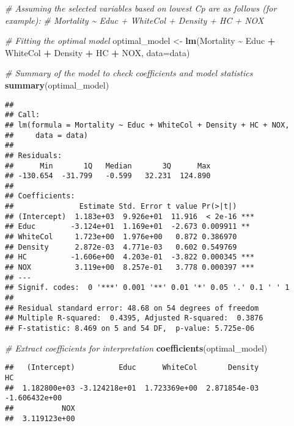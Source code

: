 \documentclass[
]{article}
\newenvironment{Shaded}{\begin{snugshade}}{\end{snugshade}}
\newcommand{\AttributeTok}[1]{\textcolor[rgb]{0.13,0.29,0.53}{#1}}
\newcommand{\CommentTok}[1]{\textcolor[rgb]{0.56,0.35,0.01}{\textit{#1}}}
\newcommand{\FunctionTok}[1]{\textcolor[rgb]{0.13,0.29,0.53}{\textbf{#1}}}
\newcommand{\NormalTok}[1]{#1}
\newcommand{\OtherTok}[1]{\textcolor[rgb]{0.56,0.35,0.01}{#1}}
\newcommand{\SpecialCharTok}[1]{\textcolor[rgb]{0.81,0.36,0.00}{\textbf{#1}}}
\begin{document}
\begin{Shaded}
\begin{Highlighting}[]
\CommentTok{\# Assuming the selected variables based on lowest Cp are as follows (for example):}
\CommentTok{\# Mortality \textasciitilde{} Educ + WhiteCol + Density + HC + NOX}

\CommentTok{\# Fitting the optimal model}
\NormalTok{optimal\_model }\OtherTok{\textless{}{-}} \FunctionTok{lm}\NormalTok{(Mortality }\SpecialCharTok{\textasciitilde{}}\NormalTok{ Educ }\SpecialCharTok{+}\NormalTok{ WhiteCol }\SpecialCharTok{+}\NormalTok{ Density }\SpecialCharTok{+}\NormalTok{ HC }\SpecialCharTok{+}\NormalTok{ NOX, }\AttributeTok{data=}\NormalTok{data)}

\CommentTok{\# Summary of the model to check coefficients and model statistics}
\FunctionTok{summary}\NormalTok{(optimal\_model)}
\end{Highlighting}
\end{Shaded}

\begin{verbatim}
## 
## Call:
## lm(formula = Mortality ~ Educ + WhiteCol + Density + HC + NOX, 
##     data = data)
## 
## Residuals:
##      Min       1Q   Median       3Q      Max 
## -130.654  -31.799   -0.599   32.231  124.890 
## 
## Coefficients:
##               Estimate Std. Error t value Pr(>|t|)    
## (Intercept)  1.183e+03  9.926e+01  11.916  < 2e-16 ***
## Educ        -3.124e+01  1.169e+01  -2.673 0.009911 ** 
## WhiteCol     1.723e+00  1.976e+00   0.872 0.386970    
## Density      2.872e-03  4.771e-03   0.602 0.549769    
## HC          -1.606e+00  4.203e-01  -3.822 0.000345 ***
## NOX          3.119e+00  8.257e-01   3.778 0.000397 ***
## ---
## Signif. codes:  0 '***' 0.001 '**' 0.01 '*' 0.05 '.' 0.1 ' ' 1
## 
## Residual standard error: 48.68 on 54 degrees of freedom
## Multiple R-squared:  0.4395, Adjusted R-squared:  0.3876 
## F-statistic: 8.469 on 5 and 54 DF,  p-value: 5.725e-06
\end{verbatim}

\begin{Shaded}
\begin{Highlighting}[]
\CommentTok{\# Extract coefficients for interpretation}
\FunctionTok{coefficients}\NormalTok{(optimal\_model)}
\end{Highlighting}
\end{Shaded}

\begin{verbatim}
##   (Intercept)          Educ      WhiteCol       Density            HC 
##  1.182800e+03 -3.124218e+01  1.723369e+00  2.871854e-03 -1.606432e+00 
##           NOX 
##  3.119123e+00
\end{verbatim}
\end{document}
